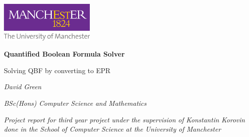 \begin{titlepage}
\centering
\includegraphics[width=0.35\textwidth]{UniOfManchesterLogo}
\par
\vspace{1cm}
{\huge\bfseries Quantified Boolean Formula Solver\par}
\vspace{1cm}
{\Large Solving QBF by converting to EPR\par}
\vspace{2cm}
{\textit{David Green}\par}
{\textit{BSc(Hons) Computer Science and Mathematics}\par}
{\textit{Project report for third year project under the supervision of Konstantin Korovin done in the School of Computer Science at the University of Manchester}\par}
\vfill
{\large \monthyear{} \par}
\end{titlepage}
